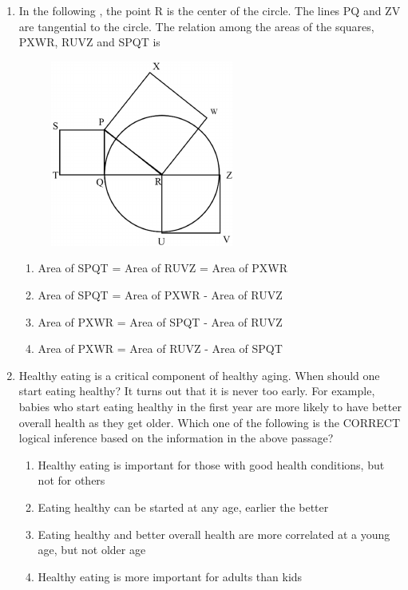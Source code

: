 \documentclass[journal,12pt,onecolumn]{IEEEtran}
\theoremstyle{remark}
\begin{document}
\begin{enumerate}
\item
In the following , the point R is the center of the circle. The lines PQ and ZV are tangential to the circle. The relation among the areas of the squares, PXWR, RUVZ and SPQT is
\begin{center}
    \begin{figure}[H] \caption{} \label{fig:5}\includegraphics{figs/5.png}\end{figure}%
\end{center}
\begin{enumerate}
    \item Area of SPQT = Area of RUVZ = Area of PXWR
    \item Area of SPQT = Area of PXWR - Area of RUVZ
    \item Area of PXWR = Area of SPQT - Area of RUVZ
    \item Area of PXWR = Area of RUVZ - Area of SPQT
\end{enumerate}


\item
Healthy eating is a critical component of healthy aging. When should one start eating healthy? It turns out that it is never too early. For example, babies who start eating healthy in the first year are more likely to have better overall health as they get older.
Which one of the following is the CORRECT logical inference based on the information in the above passage?
\begin{enumerate}
    \item Healthy eating is important for those with good health conditions, but not for others
    \item Eating healthy can be started at any age, earlier the better
    \item Eating healthy and better overall health are more correlated at a young age, but not older age
    \item Healthy eating is more important for adults than kids
\end{enumerate}



\end{enumerate}
\end{document}
